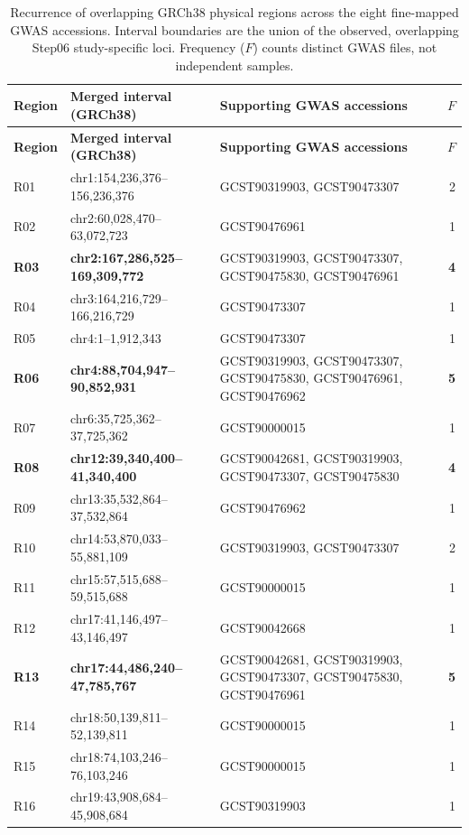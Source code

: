 \documentclass[11pt,a4paper]{article}
\begin{document}
\begingroup
\scriptsize
\setlength{\tabcolsep}{4pt}
\renewcommand{\arraystretch}{1.12}
\begin{longtable}{@{}l>{\raggedright\arraybackslash}p{5.0cm}>{\raggedright\arraybackslash}p{6.7cm}r@{}}
\caption{Recurrence of overlapping GRCh38 physical regions across
the eight fine-mapped GWAS accessions. Interval boundaries are the
union of the observed, overlapping Step06 study-specific loci.
Frequency ($F$) counts distinct GWAS files, not independent samples.}
\label{tab:finemap_overlap_frequency}\\
\toprule
\textbf{Region} & \textbf{Merged interval (GRCh38)} &
\textbf{Supporting GWAS accessions} & \textbf{$F$}\\
\midrule
\endfirsthead
\toprule
\textbf{Region} & \textbf{Merged interval (GRCh38)} &
\textbf{Supporting GWAS accessions} & \textbf{$F$}\\
\midrule
\endhead
\bottomrule
\endfoot
R01 & chr1:154,236,376--156,236,376 &
GCST90319903, GCST90473307 & 2\\
R02 & chr2:60,028,470--63,072,723 &
GCST90476961 & 1\\
\rowcolor{orange!14}
\textbf{R03} & \textbf{chr2:167,286,525--169,309,772} &
GCST90319903, GCST90473307, GCST90475830, GCST90476961 & \textbf{4}\\
R04 & chr3:164,216,729--166,216,729 &
GCST90473307 & 1\\
R05 & chr4:1--1,912,343 &
GCST90473307 & 1\\
\rowcolor{red!12}
\textbf{R06} & \textbf{chr4:88,704,947--90,852,931} &
GCST90319903, GCST90473307, GCST90475830,
GCST90476961, GCST90476962 & \textbf{5}\\
R07 & chr6:35,725,362--37,725,362 &
GCST90000015 & 1\\
\rowcolor{orange!14}
\textbf{R08} & \textbf{chr12:39,340,400--41,340,400} &
GCST90042681, GCST90319903, GCST90473307, GCST90475830 & \textbf{4}\\
R09 & chr13:35,532,864--37,532,864 &
GCST90476962 & 1\\
R10 & chr14:53,870,033--55,881,109 &
GCST90319903, GCST90473307 & 2\\
R11 & chr15:57,515,688--59,515,688 &
GCST90000015 & 1\\
R12 & chr17:41,146,497--43,146,497 &
GCST90042668 & 1\\
\rowcolor{red!12}
\textbf{R13} & \textbf{chr17:44,486,240--47,785,767} &
GCST90042681, GCST90319903, GCST90473307,
GCST90475830, GCST90476961 & \textbf{5}\\
R14 & chr18:50,139,811--52,139,811 &
GCST90000015 & 1\\
R15 & chr18:74,103,246--76,103,246 &
GCST90000015 & 1\\
R16 & chr19:43,908,684--45,908,684 &
GCST90319903 & 1\\
\end{longtable}
\endgroup
\end{document}
